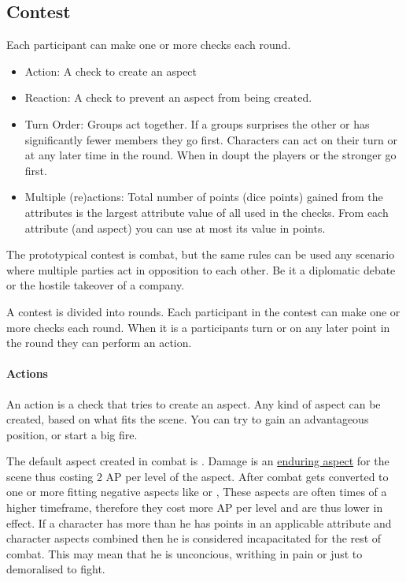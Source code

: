 \documentclass[11pt]{article}
\begin{document}
{\subsection{Contest}
\label{sec:org253cc89}
\begin{short}
Each participant can make one or more checks each round.
\begin{itemize}
\item Action: A check to create an aspect
\item Reaction: A check to prevent an aspect from being created.
\item Turn Order: Groups act together. If a groups surprises the other or has significantly fewer members they go first. Characters can act on their turn or at any later time in the round. When in doupt the players or the stronger go first.
\item Multiple (re)actions: Total number of points (dice points) gained from the attributes is the largest attribute value of all used in the checks. From each attribute (and aspect) you can use at most its value in points.
\end{itemize}
\end{short}

The prototypical contest is combat, but the same rules can be used any scenario where multiple parties act in opposition to each other. Be it a diplomatic debate or the hostile takeover of a company. 

A contest is divided into rounds. Each participant in the contest can make one or more checks each round. When it is a participants turn or on any later point in the round they can perform an action.
\paragraph*{Actions}
\label{sec:org18eefe4}
An action is a check that tries to create an aspect. Any kind of aspect can be created, based on what fits the scene. You can try to gain an advantageous position, or start a big fire.

The default aspect created in combat is . Damage is an \hyperref[sec:orgcdb4f3f]{enduring aspect} for the scene thus costing 2 AP per level of the aspect. After combat  gets converted to one or more fitting negative aspects like  or , These aspects are often times of a higher timeframe, therefore they cost more AP per level and are thus lower in effect.
If a character has more  than he has points in an applicable attribute and character aspects combined then he is considered incapacitated for the rest of combat. This may mean that he is unconcious, writhing in pain or just to demoralised to fight.

}
\end{document}
